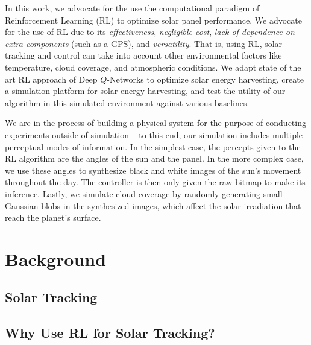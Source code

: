 \documentclass[11pt]{article}
\begin{document}
In this work, we advocate for the use the computational paradigm of Reinforcement Learning (RL) to optimize solar panel performance. We advocate for the use of RL due to its {\it effectiveness}, {\it negligible cost}, {\it lack of dependence on extra components} (such as a GPS), and {\it versatility}. That is, using RL, solar tracking and control can take into account other environmental factors like temperature, cloud coverage, and atmospheric conditions. We adapt state of the art RL approach of Deep $Q$-Networks to optimize solar energy harvesting, create a simulation platform for solar energy harvesting, and test the utility of our algorithm in this simulated environment against various baselines.

We are in the process of building a physical system for the purpose of conducting experiments outside of simulation -- to this end, our simulation includes multiple perceptual modes of information. In the simplest case, the percepts given to the RL algorithm are the angles of the sun and the panel. In the more complex case, we use these angles to synthesize black and white images of the sun's movement throughout the day. The controller is then only given the raw bitmap to make its inference. Lastly, we simulate cloud coverage by randomly generating small Gaussian blobs in the synthesized images, which affect the solar irradiation that reach the planet's surface.


\section{Background}

\subsection{Solar Tracking}



\subsection{Why Use RL for Solar Tracking?}
\end{document}
